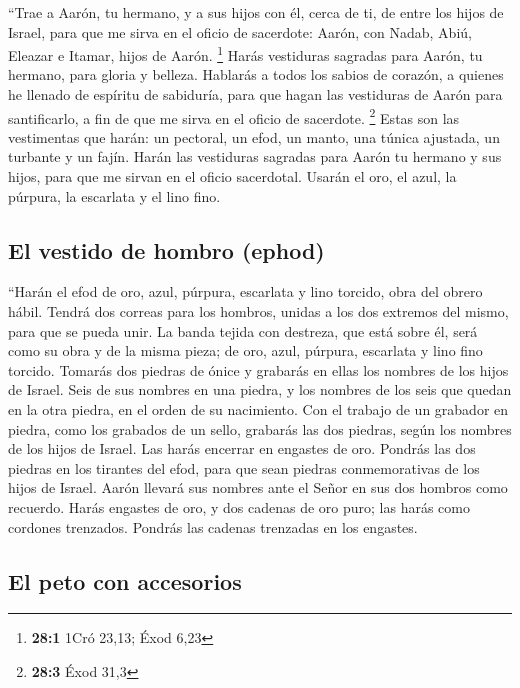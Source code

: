  ``Trae a Aarón, tu hermano, y a sus hijos con él, cerca
de ti, de entre los hijos de Israel, para que me sirva en el oficio de
sacerdote: Aarón, con Nadab, Abiú, Eleazar e Itamar, hijos de Aarón.
\footnote{\textbf{28:1} 1Cró 23,13; Éxod 6,23}  Harás
vestiduras sagradas para Aarón, tu hermano, para gloria y belleza.
 Hablarás a todos los sabios de corazón, a quienes he
llenado de espíritu de sabiduría, para que hagan las vestiduras de Aarón
para santificarlo, a fin de que me sirva en el oficio de sacerdote.
\footnote{\textbf{28:3} Éxod 31,3}  Estas son las
vestimentas que harán: un pectoral, un efod, un manto, una túnica
ajustada, un turbante y un fajín. Harán las vestiduras sagradas para
Aarón tu hermano y sus hijos, para que me sirvan en el oficio
sacerdotal.  Usarán el oro, el azul, la púrpura, la
escarlata y el lino fino.

\hypertarget{el-vestido-de-hombro-ephod}{%
\subsection{El vestido de hombro
(ephod)}\label{el-vestido-de-hombro-ephod}}

 ``Harán el efod de oro, azul, púrpura, escarlata y lino
torcido, obra del obrero hábil.  Tendrá dos correas para
los hombros, unidas a los dos extremos del mismo, para que se pueda
unir.  La banda tejida con destreza, que está sobre él,
será como su obra y de la misma pieza; de oro, azul, púrpura, escarlata
y lino fino torcido.  Tomarás dos piedras de ónice y
grabarás en ellas los nombres de los hijos de Israel. 
Seis de sus nombres en una piedra, y los nombres de los seis que quedan
en la otra piedra, en el orden de su nacimiento.  Con el
trabajo de un grabador en piedra, como los grabados de un sello,
grabarás las dos piedras, según los nombres de los hijos de Israel. Las
harás encerrar en engastes de oro.  Pondrás las dos
piedras en los tirantes del efod, para que sean piedras conmemorativas
de los hijos de Israel. Aarón llevará sus nombres ante el Señor en sus
dos hombros como recuerdo.  Harás engastes de oro,
 y dos cadenas de oro puro; las harás como cordones
trenzados. Pondrás las cadenas trenzadas en los engastes.

\hypertarget{el-peto-con-accesorios}{%
\subsection{El peto con accesorios}\label{el-peto-con-accesorios}}

